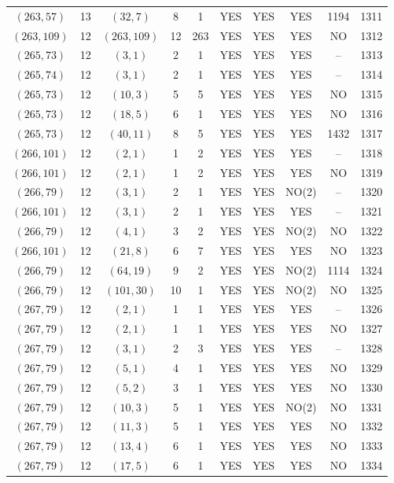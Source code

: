 \begin{longtable}{|c|c|c|c|c|c|c|c|c|c|}
$(263, 57)$ & 13 & $(32, 7)$ & 8 & 1 & YES & YES & YES & 1194 & 1311\\
$(263, 109)$ & 12 & $(263, 109)$ & 12 & 263 & YES & YES & YES & NO & 1312\\
$(265, 73)$ & 12 & $(3, 1)$ & 2 & 1 & YES & YES & YES & -- & 1313\\
$(265, 74)$ & 12 & $(3, 1)$ & 2 & 1 & YES & YES & YES & -- & 1314\\
$(265, 73)$ & 12 & $(10, 3)$ & 5 & 5 & YES & YES & YES & NO & 1315\\
$(265, 73)$ & 12 & $(18, 5)$ & 6 & 1 & YES & YES & YES & NO & 1316\\
$(265, 73)$ & 12 & $(40, 11)$ & 8 & 5 & YES & YES & YES & 1432 & 1317\\
$(266, 101)$ & 12 & $(2, 1)$ & 1 & 2 & YES & YES & YES & -- & 1318\\
$(266, 101)$ & 12 & $(2, 1)$ & 1 & 2 & YES & YES & YES & NO & 1319\\
$(266, 79)$ & 12 & $(3, 1)$ & 2 & 1 & YES & YES & NO(2) & -- & 1320\\
$(266, 101)$ & 12 & $(3, 1)$ & 2 & 1 & YES & YES & YES & -- & 1321\\
$(266, 79)$ & 12 & $(4, 1)$ & 3 & 2 & YES & YES & NO(2) & NO & 1322\\
$(266, 101)$ & 12 & $(21, 8)$ & 6 & 7 & YES & YES & YES & NO & 1323\\
$(266, 79)$ & 12 & $(64, 19)$ & 9 & 2 & YES & YES & NO(2) & 1114 & 1324\\
$(266, 79)$ & 12 & $(101, 30)$ & 10 & 1 & YES & YES & NO(2) & NO & 1325\\
$(267, 79)$ & 12 & $(2, 1)$ & 1 & 1 & YES & YES & YES & -- & 1326\\
$(267, 79)$ & 12 & $(2, 1)$ & 1 & 1 & YES & YES & YES & NO & 1327\\
$(267, 79)$ & 12 & $(3, 1)$ & 2 & 3 & YES & YES & YES & -- & 1328\\
$(267, 79)$ & 12 & $(5, 1)$ & 4 & 1 & YES & YES & YES & NO & 1329\\
$(267, 79)$ & 12 & $(5, 2)$ & 3 & 1 & YES & YES & YES & NO & 1330\\
$(267, 79)$ & 12 & $(10, 3)$ & 5 & 1 & YES & YES & NO(2) & NO & 1331\\
$(267, 79)$ & 12 & $(11, 3)$ & 5 & 1 & YES & YES & YES & NO & 1332\\
$(267, 79)$ & 12 & $(13, 4)$ & 6 & 1 & YES & YES & YES & NO & 1333\\
$(267, 79)$ & 12 & $(17, 5)$ & 6 & 1 & YES & YES & YES & NO & 1334\\

\end{longtable}
